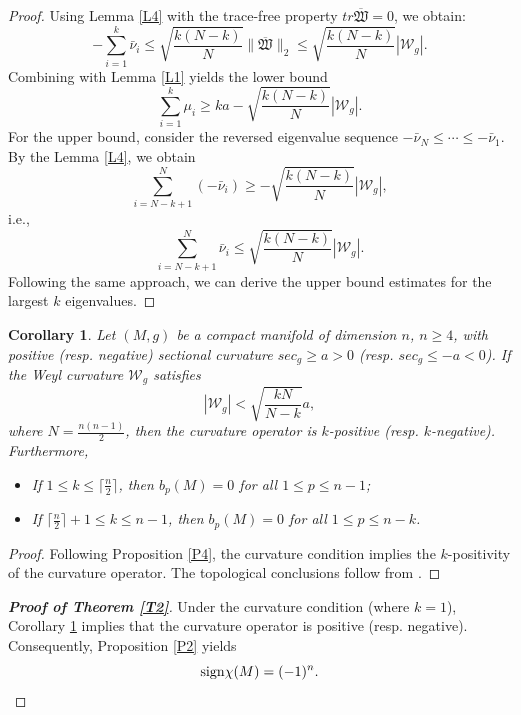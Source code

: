 \documentclass[12pt, twoside]{article}
\newtheorem{corollary}[theorem]{Corollary}
\theoremstyle{definition}
\numberwithin{equation}{section}
\begin{document}
\begin{proof}
Using Lemma \ref{L4} with the trace-free property $tr \overline{\mathfrak{W}} = 0$, we obtain:
	$$-\sum_{i=1}^{k}\bar{\nu}_{i}\leq \sqrt{\frac{k(N-k)}{N}}\|\overline{\mathfrak{W}}\|_{2}\leq \sqrt{\frac{k(N-k)}{N}}|\mathcal{W}_{g}|.$$
Combining with Lemma \ref{L1} yields the lower bound
	$$\sum_{i=1}^{k}\mu_{i}\geq ka-\sqrt{\frac{k(N-k)}{N}}|\mathcal{W}_{g}|.$$
For the upper bound, consider the reversed eigenvalue sequence $-\bar{\nu}_N \leq \cdots \leq -\bar{\nu}_1$. By the Lemma \ref{L4}, we obtain
$$\sum_{i=N-k+1}^{N}(-\bar{\nu}_{i})\geq -\sqrt{\frac{k(N-k)}{N}}|\mathcal{W}_{g}|,$$
i.e.,$$\sum_{i=N-k+1}^{N}\bar{\nu}_{i}\leq \sqrt{\frac{k(N-k)}{N}}|\mathcal{W}_{g}|.$$
Following the same approach, we can derive the upper bound estimates for the largest $k$ eigenvalues.
\end{proof}
\begin{corollary}\label{C1}
	Let $(M,g)$ be a compact manifold of dimension $n$, $n\geq4$, with positive (resp. negative) sectional curvature $sec_{g}\geq a>0$ (resp. $sec_{g}\leq -a<0$). If the Weyl curvature $\mathcal{W}_{g}$ satisfies
	$$|\mathcal{W}_{g}|<\sqrt{\frac{kN}{N-k}}a,$$
	where $N=\frac{n(n-1)}{2}$,	then the curvature operator is $k$-positive (resp. $k$-negative). Furthermore, 	
	\begin{itemize}
		\item[(1)]If $1\leq k\leq \lceil\frac{n}{2}\rceil$, then $b_{p}(M)=0$ for all $1\leq p\leq n-1$;
		\item[(2)]If $ \lceil\frac{n}{2}\rceil+1\leq k\leq n-1$, then 
		$b_{p}(M)=0$ for all $1\leq p\leq n-k$.
	\end{itemize}
	\end{corollary}
\begin{proof}
	Following Proposition \ref{P4}, the curvature condition implies the $k$-positivity of the curvature operator. The topological conclusions follow from \cite[Theorem A]{PW21a}.
\end{proof}

\begin{proof}[\textbf{Proof of Theorem \ref{T2}}]
Under the curvature condition (where $k=1$), Corollary \ref{C1} implies that the curvature operator is positive (resp. negative). Consequently, Proposition \ref{P2} yields 
$${\rm{sign}}\chi(M)=(-1)^{n}.$$
\end{proof}	
\end{document}
